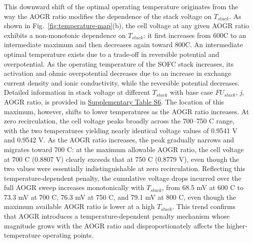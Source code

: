 \documentclass[a4paper,10pt]{cas-dc} %
\begin{document}
This downward shift of the optimal operating temperature originates from the way the AOGR ratio modifies the dependence of the stack voltage on \(T_{stack}\).
As shown in Fig.~\ref{fig:temperature-map}(b), the cell voltage at any given AOGR ratio exhibits a non-monotonic dependence on \(T_{stack}\): it first increases from 600\textdegree C to an intermediate maximum and then decreases again toward 800\textdegree C.
An intermediate optimal temperature exists due to a trade-off in reversible potential and overpotential.
As the operating temperature of the SOFC stack increases, its activation and ohmic overpotential decreases due to an increase in exchange current density and ionic conductivity, while the reversible potential decreases.
Detailed information in stack voltage at different \(T_{stack}\) with base case \({FU}_{stack}\), \emph{j}, AOGR ratio, is provided in \href{Supplementary.pdf}{Supplementary Table S6}.
The location of this maximum, however, shifts to lower temperatures as the AOGR ratio increases.
At zero recirculation, the cell voltage peaks broadly across the 700--750 \textdegree C range, with the two temperatures yielding nearly identical voltage values of 0.9541 V and 0.9542 V.
As the AOGR ratio increases, the peak gradually narrows and migrates toward 700 \textdegree C: at the maximum allowable AOGR ratio, the cell voltage at 700 \textdegree C (0.8807 V) clearly exceeds that at 750 \textdegree C (0.8779 V), even though the two values were essentially indistinguishable at zero recirculation.
Reflecting this temperature-dependent penalty, the cumulative voltage drops incurred over the full AOGR sweep increases monotonically with \(T_{stack}\), from 68.5 mV at 600 \textdegree C to 73.3 mV at 700 \textdegree C, 76.3 mV at 750 \textdegree C, and 79.1 mV at 800 \textdegree C, even though the maximum available AOGR ratio is lower at a high \(T_{stack}\).
This trend confirms that AOGR introduces a temperature-dependent penalty mechanism whose magnitude grows with the AOGR ratio and disproportionately affects the higher-temperature operating points.
\end{document}
